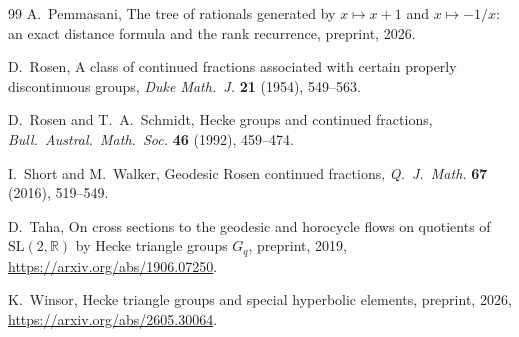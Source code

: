 \begin{thebibliography}{99}
A.~Pemmasani, The tree of rationals generated by $x\mapsto x+1$ and $x\mapsto-1/x$: an exact distance
formula and the rank recurrence, preprint, 2026.

D.~Rosen, A class of continued fractions associated with certain properly discontinuous groups,
\emph{Duke Math.\ J.} \textbf{21} (1954), 549--563.

D.~Rosen and T.~A.~Schmidt, Hecke groups and continued fractions, \emph{Bull.\ Austral.\ Math.\ Soc.}
\textbf{46} (1992), 459--474.

I.~Short and M.~Walker, Geodesic Rosen continued fractions, \emph{Q.\ J.\ Math.} \textbf{67} (2016),
519--549.

D.~Taha, On cross sections to the geodesic and horocycle flows on quotients of
$\mathrm{SL}(2,\mathbb{R})$ by Hecke triangle groups $G_q$, preprint, 2019,
\url{https://arxiv.org/abs/1906.07250}.

K.~Winsor, Hecke triangle groups and special hyperbolic elements, preprint, 2026,
\url{https://arxiv.org/abs/2605.30064}.

\end{thebibliography}
